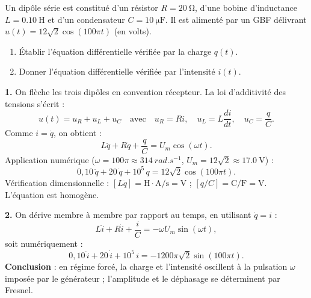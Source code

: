 \documentclass[11pt]{article}
\begin{document}
\begin{exoresolu}
Un dipôle série est constitué d'un résistor $R = \SI{20}{\ohm}$, d'une bobine d'inductance $L = \SI{0,10}{\henry}$ et d'un condensateur $C = \SI{10}{\micro\farad}$. Il est alimenté par un GBF délivrant $u(t) = 12\sqrt{2}\cos(100\pi t)$ (en volts).
\begin{enumerate}
\item Établir l'équation différentielle vérifiée par la charge $q(t)$.
\item Donner l'équation différentielle vérifiée par l'intensité $i(t)$.
\end{enumerate}
\tcblower
\textbf{1.} On flèche les trois dipôles en convention récepteur. La loi d'additivité des tensions s'écrit :
\[ u(t) = u_R + u_L + u_C \quad\text{avec}\quad u_R = Ri,\quad u_L = L\dfrac{di}{dt},\quad u_C = \dfrac{q}{C}. \]
Comme $i = \dot{q}$, on obtient :
\[ L\ddot{q} + R\dot{q} + \dfrac{q}{C} = U_m\cos(\omega t). \]
Application numérique ($\omega = 100\pi \approx \SI{314}{rad.s^{-1}}$, $U_m = 12\sqrt{2} \approx \SI{17,0}{\volt}$) :
\[ 0{,}10\,\ddot{q} + 20\,\dot{q} + 10^{5}\,q = 12\sqrt{2}\cos(100\pi t). \]
Vérification dimensionnelle : $[L\ddot{q}] = \mathrm{H\cdot A/s} = \mathrm{V}$ ; $[q/C] = \mathrm{C/F} = \mathrm{V}$. L'équation est homogène.

\textbf{2.} On dérive membre à membre par rapport au temps, en utilisant $\dot{q} = i$ :
\[ L\ddot{i} + R\dot{i} + \dfrac{i}{C} = -\omega U_m\sin(\omega t), \]
soit numériquement :
\[ 0{,}10\,\ddot{i} + 20\,\dot{i} + 10^{5}\,i = -1200\pi\sqrt{2}\sin(100\pi t). \]
\textbf{Conclusion} : en régime forcé, la charge et l'intensité oscillent à la pulsation $\omega$ imposée par le générateur ; l'amplitude et le déphasage se déterminent par Fresnel.
\end{exoresolu}
\end{document}
